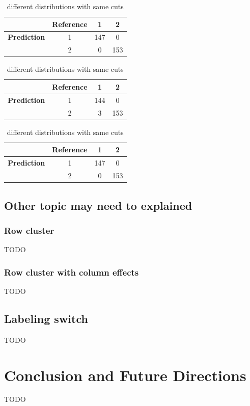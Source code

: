 \documentclass{article}
\begin{document}
\begin{table}[ht]
  \centering

  \caption*{\textbf{Confusion matrix of Normal Distributions}}

  \begin{minipage}{0.45\textwidth}
    \centering
    \begin{tabular}{c|c|c|c}
              & \textbf{Reference} & 1 & 2 \\
    \hline
    \textbf{Prediction} & 1 & 147 & 0 \\
                        & 2 & 0 & 153 \\
    \end{tabular}
    \caption{Far center}
    \label{tab:nor_far}
  \end{minipage}
  \hfill
  \begin{minipage}{0.45\textwidth}
    \centering
    \begin{tabular}{c|c|c|c}
              & \textbf{Reference} & 1 & 2 \\
    \hline
    \textbf{Prediction} & 1 & 144 & 0 \\
                        & 2 & 3 & 153 \\
    \end{tabular}
    \caption{Close center}
    \label{tab:nor_close}
  \end{minipage}

  \vspace{1em} %

  \begin{minipage}{0.45\textwidth}
    \centering
    \begin{tabular}{c|c|c|c}
              & \textbf{Reference} & 1 & 2 \\
    \hline
    \textbf{Prediction} & 1 & 147 & 0 \\
                        & 2 & 0 & 153 \\
    \end{tabular}
    \caption{different distributions with same cuts}
    \label{tab:nor_cuts}
  \end{minipage}
\end{table}

\subsection{Other topic may need to explained}

\subsubsection{Row cluster}

TODO

\subsubsection{Row cluster with column effects}

TODO


\subsection{Labeling switch}

TODO

\section{Conclusion and Future Directions}

TODO

\printbibliography
\end{document}
